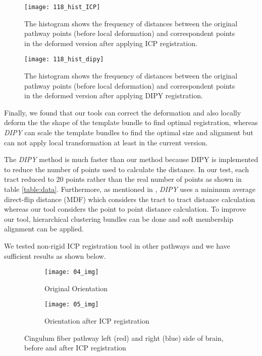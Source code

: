 \documentclass[../structure.tex]{subfiles}
\begin{document}
\begin{figure}[H]
\centering
\texttt{[image: 118\_hist\_ICP]}
\captionsetup{justification=centering}
\caption{The histogram shows the frequency of distances between the original pathway points (before local deformation) and correspondent points in the deformed version after applying ICP registration.}
\label{fig:hist_icp_def}
\end{figure}

\begin{figure}[H]
\centering
\texttt{[image: 118\_hist\_dipy]}
\captionsetup{justification=centering}
\caption{The histogram shows the frequency of distances between the original pathway points (before local deformation) and correspondent points in the deformed version after applying DIPY registration.}
\label{fig:hist_dipy_def}
\end{figure}

Finally, we found that our tools can correct the deformation and also locally deform the the shape of the template bundle to find optimal registration, whereas \textit{DIPY} can scale the template bundles to find the optimal size and alignment but can not apply local transformation at least in the current version.

The \textit{DIPY} method is much faster than our method because DIPY is implemented to reduce the number of points used to calculate the distance. In our test, each tract reduced to 20 points rather than the real number of points as shown in table \ref{table:data}. Furthermore, as mentioned in \cite{Garyfallidis2012}, \textit{DIPY} uses a minimum average direct-flip distance (MDF) which considers the tract to tract distance calculation whereas our tool considers the point to point distance calculation. To improve our tool, hierarchical clustering bundles can be done and soft membership alignment can be applied.

We tested non-rigid ICP registration tool in other pathways and we have sufficient results as shown below.

\begin{figure}[H]
	\centering
	\begin{subfigure}[b]{0.49\textwidth}
	\centering
	\texttt{[image: 04\_img]}
	\caption{Original Orientation}
	\end{subfigure}
	\begin{subfigure}[b]{0.49\textwidth}
	\centering
	\texttt{[image: 05\_img]}
	\caption{Orientation after ICP registration}
	\end{subfigure}
\captionsetup{justification=centering}
\caption{Cingulum fiber pathway left (red) and right (blue) side of brain, before and after ICP registration}
\label{fig:pca}
\end{figure}
\end{document}
